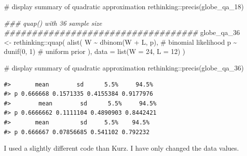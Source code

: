 \documentclass[
  letterpaper,
  DIV=11,
  numbers=noendperiod]{scrreprt}
\newenvironment{Shaded}{\begin{snugshade}}{\end{snugshade}}
\newcommand{\AttributeTok}[1]{\textcolor[rgb]{0.40,0.45,0.13}{#1}}
\newcommand{\CommentTok}[1]{\textcolor[rgb]{0.37,0.37,0.37}{#1}}
\newcommand{\DecValTok}[1]{\textcolor[rgb]{0.68,0.00,0.00}{#1}}
\newcommand{\DocumentationTok}[1]{\textcolor[rgb]{0.37,0.37,0.37}{\textit{#1}}}
\newcommand{\FunctionTok}[1]{\textcolor[rgb]{0.28,0.35,0.67}{#1}}
\newcommand{\InformationTok}[1]{\textcolor[rgb]{0.37,0.37,0.37}{#1}}
\newcommand{\NormalTok}[1]{\textcolor[rgb]{0.00,0.23,0.31}{#1}}
\newcommand{\OtherTok}[1]{\textcolor[rgb]{0.00,0.23,0.31}{#1}}
\newcommand{\SpecialCharTok}[1]{\textcolor[rgb]{0.37,0.37,0.37}{#1}}
\begin{document}
\begin{codelisting}
\begin{Shaded}
\begin{Highlighting}[]
\CommentTok{\# display summary of quadratic approximation}
\NormalTok{rethinking}\SpecialCharTok{::}\FunctionTok{precis}\NormalTok{(globe\_qa\_18)}

\DocumentationTok{\#\#\# quap() with 36 sample size \#\#\#\#\#\#\#\#\#\#\#\#\#\#\#\#\#\#\#\#\#\#\#\#\#\#\#\#\#\#\#\#\#\#\#}
\NormalTok{globe\_qa\_36 }\OtherTok{\textless{}{-}}\NormalTok{ rethinking}\SpecialCharTok{::}\FunctionTok{quap}\NormalTok{(}
  \FunctionTok{alist}\NormalTok{(}
\NormalTok{    W }\SpecialCharTok{\textasciitilde{}} \FunctionTok{dbinom}\NormalTok{(W }\SpecialCharTok{+}\NormalTok{ L, p), }\CommentTok{\# binomial likelihood}
\NormalTok{    p }\SpecialCharTok{\textasciitilde{}} \FunctionTok{dunif}\NormalTok{(}\DecValTok{0}\NormalTok{, }\DecValTok{1}\NormalTok{) }\CommentTok{\# uniform prior}
\NormalTok{  ),}
  \AttributeTok{data =} \FunctionTok{list}\NormalTok{(}\AttributeTok{W =} \DecValTok{24}\NormalTok{, }\AttributeTok{L =} \DecValTok{12}\NormalTok{)}
\NormalTok{)}

\CommentTok{\# display summary of quadratic approximation}
\NormalTok{rethinking}\SpecialCharTok{::}\FunctionTok{precis}\NormalTok{(globe\_qa\_36)}
\InformationTok{\textasciigrave{}\textasciigrave{}\textasciigrave{}}
\end{Highlighting}
\end{Shaded}

\end{codelisting}

\begin{verbatim}
#>       mean        sd      5.5%     94.5%
#> p 0.666668 0.1571335 0.4155384 0.9177976
#>        mean        sd      5.5%     94.5%
#> p 0.6666662 0.1111104 0.4890903 0.8442421
#>       mean         sd     5.5%    94.5%
#> p 0.666667 0.07856685 0.541102 0.792232
\end{verbatim}

\begin{tcolorbox}[enhanced jigsaw, colframe=quarto-callout-note-color-frame, colback=white, toprule=.15mm, breakable, arc=.35mm, bottomtitle=1mm, colbacktitle=quarto-callout-note-color!10!white, toptitle=1mm, titlerule=0mm, title=\textcolor{quarto-callout-note-color}{\faInfo}\hspace{0.5em}{Slightly different code}, leftrule=.75mm, opacityback=0, rightrule=.15mm, opacitybacktitle=0.6, bottomrule=.15mm, left=2mm, coltitle=black]

I used a slightly different code than Kurz. I have only changed the data
values.

\end{tcolorbox}
\end{document}
